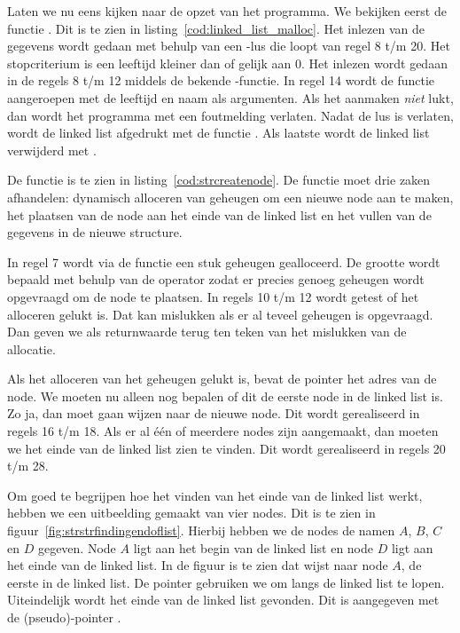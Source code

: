 
Laten we nu eens kijken naar de opzet van het programma. We bekijken eerst de functie . Dit is te zien in listing~\ref{cod:linked_list_malloc}.
%
%
Het inlezen van de gegevens wordt gedaan met behulp van een \mbox{}-lus die loopt van regel 8 t/m 20. Het stopcriterium is een leeftijd kleiner dan of gelijk aan 0. Het inlezen wordt gedaan in de regels 8 t/m 12 middels de bekende -functie. In regel 14 wordt de functie  aangeroepen met de leeftijd en naam als argumenten. Als het aanmaken \textsl{niet} lukt, dan wordt het programma met een foutmelding verlaten. Nadat de lus is verlaten, wordt de linked list afgedrukt met de functie . Als laatste wordt de linked list verwijderd met .

De functie  is te zien in listing~\ref{cod:strcreatenode}. De functie moet drie zaken afhandelen: dynamisch alloceren van geheugen om een nieuwe node aan te maken, het plaatsen van de node aan het einde van de linked list en het vullen van de gegevens in de nieuwe structure.


In regel 7 wordt via de functie  een stuk geheugen gealloceerd. De grootte wordt bepaald met behulp van de operator  zodat er precies genoeg geheugen wordt opgevraagd om de node te plaatsen. In regels 10 t/m 12 wordt getest of het alloceren gelukt is. Dat kan mislukken als er al teveel geheugen is opgevraagd. Dan geven we als returnwaarde  terug ten teken van het mislukken van de allocatie.

Als het alloceren van het geheugen gelukt is, bevat de pointer  het adres van de node. We moeten nu alleen nog bepalen of dit de eerste node in de linked list is. Zo ja, dan moet  gaan wijzen naar de nieuwe node. Dit wordt gerealiseerd in regels 16 t/m 18. Als er al één of meerdere nodes zijn aangemaakt, dan moeten we het einde van de linked list zien te vinden. Dit wordt gerealiseerd in regels 20 t/m 28.

Om goed te begrijpen hoe het vinden van het einde van de linked list werkt, hebben we een uitbeelding gemaakt van vier nodes. Dit is te zien in figuur~\ref{fig:strstrfindingendoflist}. Hierbij hebben we de nodes de namen $A$, $B$, $C$ en $D$ gegeven. Node $A$ ligt aan het begin van de linked list en node $D$ ligt aan het einde van de linked list. In de figuur is te zien dat  wijst naar node $A$, de eerste in de linked list. De pointer  gebruiken we om langs de linked list te lopen. Uiteindelijk wordt het einde van de linked list gevonden. Dit is aangegeven met de (pseudo)-pointer .

